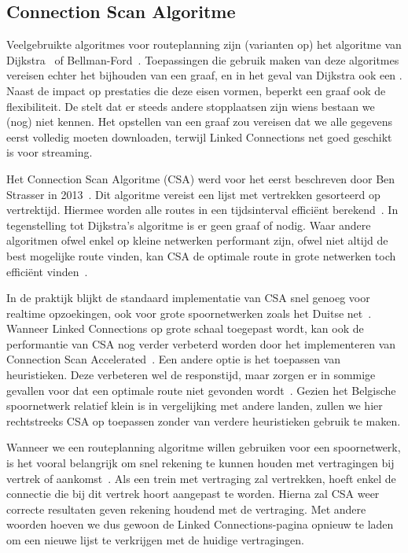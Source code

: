 \subsection{Connection Scan Algoritme}
\label{sec:csa}
Veelgebruikte algoritmes voor routeplanning zijn (varianten op) het algoritme van Dijkstra~\citep{Dijkstra59, strasser13,hannemann07,hannemann08} of Bellman-Ford~\citep{Bellmanford58}. Toepassingen die gebruik maken van deze algoritmes vereisen echter het bijhouden van een graaf, en in het geval van Dijkstra ook een . Naast de impact op prestaties die deze eisen vormen, beperkt een graaf ook de flexibiliteit. De  stelt dat er steeds andere stopplaatsen zijn wiens bestaan we (nog) niet kennen. Het opstellen van een graaf zou vereisen dat we alle gegevens eerst volledig moeten downloaden, terwijl Linked Connections net goed geschikt is voor streaming. 

Het Connection Scan Algoritme (CSA) werd voor het eerst beschreven door Ben Strasser in 2013~\citep{strasser13}. Dit algoritme vereist een lijst met vertrekken gesorteerd op vertrektijd. Hiermee worden alle routes in een tijdsinterval efficiënt berekend~\citep{strasser14,strasser17}. In tegenstelling tot Dijkstra's algoritme is er geen graaf of  nodig. Waar andere algoritmen ofwel enkel op kleine netwerken performant zijn, ofwel niet altijd de best mogelijke route vinden, kan CSA de optimale route in grote netwerken toch efficiënt vinden~\citep{strasser14}.

In de praktijk blijkt de standaard implementatie van CSA snel genoeg voor realtime opzoekingen, ook voor grote spoornetwerken zoals het Duitse net~\citep{strasser14}. Wanneer Linked Connections op grote schaal toegepast wordt, kan ook de performantie van CSA nog verder verbeterd worden door het implementeren van Connection Scan Accelerated~\citep{strasser14,strasser17}. Een andere optie is het toepassen van heuristieken. Deze verbeteren wel de responstijd, maar zorgen er in sommige gevallen voor dat een optimale route niet gevonden wordt~\citep{hannemann07}. Gezien het Belgische spoornetwerk relatief klein is in vergelijking met andere landen, zullen we hier rechtstreeks CSA op toepassen zonder van verdere heuristieken gebruik te maken. 

Wanneer we een routeplanning algoritme willen gebruiken voor een spoornetwerk, is het vooral belangrijk om snel rekening te kunnen houden met vertragingen bij vertrek of aankomst~\citep{strasser14,strasser17}. Als een trein met vertraging zal vertrekken, hoeft enkel de connectie die bij dit vertrek hoort aangepast te worden. Hierna zal CSA weer correcte resultaten geven rekening houdend met de vertraging. Met andere woorden hoeven we dus gewoon de Linked Connections-pagina opnieuw te laden om een nieuwe lijst te verkrijgen met de huidige vertragingen. 

